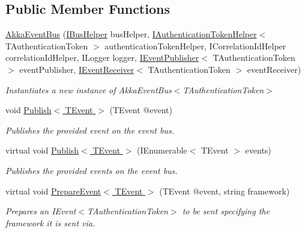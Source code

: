 \subsection*{Public Member Functions}
\begin{DoxyCompactItemize}
\item 
\hyperlink{classCqrs_1_1Akka_1_1Events_1_1AkkaEventBus_ab1f292c21b5516a89fdcc019deb04063_ab1f292c21b5516a89fdcc019deb04063}{Akka\+Event\+Bus} (\hyperlink{interfaceCqrs_1_1Bus_1_1IBusHelper}{I\+Bus\+Helper} bus\+Helper, \hyperlink{interfaceCqrs_1_1Authentication_1_1IAuthenticationTokenHelper}{I\+Authentication\+Token\+Helper}$<$ T\+Authentication\+Token $>$ authentication\+Token\+Helper, I\+Correlation\+Id\+Helper correlation\+Id\+Helper, I\+Logger logger, \hyperlink{interfaceCqrs_1_1Events_1_1IEventPublisher}{I\+Event\+Publisher}$<$ T\+Authentication\+Token $>$ event\+Publisher, \hyperlink{interfaceCqrs_1_1Events_1_1IEventReceiver}{I\+Event\+Receiver}$<$ T\+Authentication\+Token $>$ event\+Receiver)
\begin{DoxyCompactList}\small\item\em Instantiates a new instance of Akka\+Event\+Bus$<$\+T\+Authentication\+Token$>$ \end{DoxyCompactList}\item 
void \hyperlink{classCqrs_1_1Akka_1_1Events_1_1AkkaEventBus_aaba5d37020e21d03cc2bbc3da14f45ea_aaba5d37020e21d03cc2bbc3da14f45ea}{Publish$<$ T\+Event $>$} (T\+Event @event)
\begin{DoxyCompactList}\small\item\em Publishes the provided {\itshape event}  on the event bus. \end{DoxyCompactList}\item 
virtual void \hyperlink{classCqrs_1_1Akka_1_1Events_1_1AkkaEventBus_ad5b996dd77efbf51a2b5a32f94417772_ad5b996dd77efbf51a2b5a32f94417772}{Publish$<$ T\+Event $>$} (I\+Enumerable$<$ T\+Event $>$ events)
\begin{DoxyCompactList}\small\item\em Publishes the provided {\itshape events}  on the event bus. \end{DoxyCompactList}\item 
virtual void \hyperlink{classCqrs_1_1Akka_1_1Events_1_1AkkaEventBus_ae9d248ec73204a7909c04e5a87bfeefb_ae9d248ec73204a7909c04e5a87bfeefb}{Prepare\+Event$<$ T\+Event $>$} (T\+Event @event, string framework)
\begin{DoxyCompactList}\small\item\em Prepares an I\+Event$<$\+T\+Authentication\+Token$>$ to be sent specifying the framework it is sent via. \end{DoxyCompactList}\item 

\end{DoxyCompactItemize}
